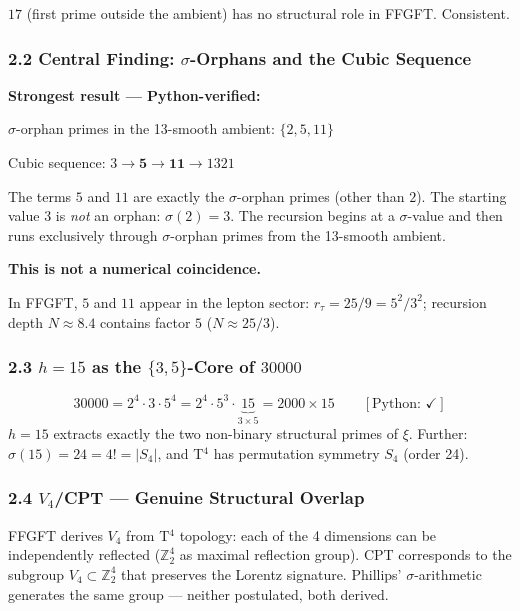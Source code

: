$17$ (first prime outside the ambient) has no structural role in FFGFT. Consistent.

\subsubsection*{2.2 Central Finding: $\sigma$-Orphans and the Cubic Sequence}

\begin{mdframed}[style=ok]
\textbf{Strongest result — Python-verified:}

$\sigma$-orphan primes in the 13-smooth ambient: $\{2, 5, 11\}$

Cubic sequence: $3 \to \mathbf{5} \to \mathbf{11} \to 1321$

The terms $5$ and $11$ are exactly the $\sigma$-orphan primes (other than $2$).
The starting value $3$ is \textit{not} an orphan: $\sigma(2) = 3$.
The recursion begins at a $\sigma$-value and then runs exclusively through
$\sigma$-orphan primes from the 13-smooth ambient.

\textbf{This is not a numerical coincidence.}
\end{mdframed}

In FFGFT, $5$ and $11$ appear in the lepton sector:
$r_\tau = 25/9 = 5^2/3^2$; recursion depth $N \approx 8.4$ contains factor $5$
($N \approx 25/3$).

\subsubsection*{2.3 $h = 15$ as the $\{3,5\}$-Core of $30000$}

\[
30000 = 2^4 \cdot 3 \cdot 5^4 = 2^4 \cdot 5^3 \cdot \underbrace{15}_{3 \times 5}
= 2000 \times 15 \qquad [\text{Python: } \checkmark]
\]
$h = 15$ extracts exactly the two non-binary structural primes of $\xi$.
Further: $\sigma(15) = 24 = 4! = |S_4|$,
and T$^4$ has permutation symmetry $S_4$ (order 24).

\subsubsection*{2.4 $V_4$/CPT — Genuine Structural Overlap}

FFGFT derives $V_4$ from T$^4$ topology: each of the 4 dimensions can be
independently reflected ($\mathbb{Z}_2^4$ as maximal reflection group).
CPT corresponds to the subgroup $V_4 \subset \mathbb{Z}_2^4$
that preserves the Lorentz signature. Phillips' $\sigma$-arithmetic generates
the same group — neither postulated, both derived.

